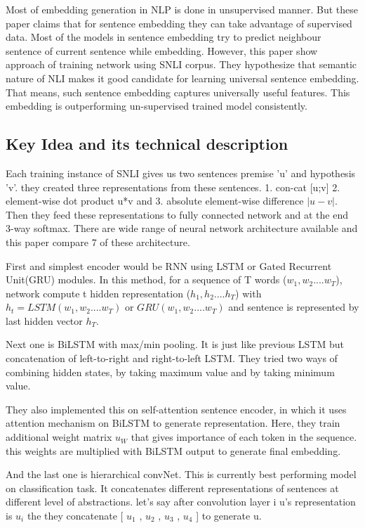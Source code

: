 \documentclass[11pt,a4paper]{article}
\begin{document}
Most of embedding generation in NLP is done in unsupervised manner. But these paper claims that for sentence embedding they can take advantage of supervised data. Most of the models in sentence embedding try to predict neighbour sentence of current sentence while embedding. However, this paper show approach of training network using SNLI corpus. They hypothesize that semantic nature of NLI makes it good candidate for learning universal sentence embedding. That means, such sentence embedding captures universally useful features. This embedding is outperforming un-supervised trained model consistently. 




\subsection{Key Idea and its technical description}

Each training instance of SNLI gives us two sentences premise 'u' and hypothesis 'v'. they created three representations from these sentences. 1. con-cat [u;v] 2. element-wise dot product u*v and 3. absolute element-wise difference $|u-v|$. Then they feed these representations to fully connected network and at the end 3-way softmax. There are wide range of neural network architecture available and this paper compare 7 of these architecture. 

First and simplest encoder would be RNN using LSTM or Gated Recurrent Unit(GRU) modules. In this method, for a sequence of T words ($w_{1},w_{2}....w_{T}$), network compute t hidden representation ($h_{1},h_{2}....h_{T}$) with $h_{t} = LSTM(w_{1},w_{2}....w_{T})$  or $GRU(w_{1},w_{2}....w_{T})$ and sentence is represented by last hidden vector $h_T$.

Next one is BiLSTM with max/min pooling.  It is just like previous LSTM but concatenation of left-to-right and right-to-left LSTM. They tried two ways of combining hidden states, by taking maximum value and by taking minimum value.

They also implemented this on self-attention sentence encoder, in which it uses attention mechanism on BiLSTM to generate representation. Here, they train additional weight matrix $u_{W}$ that gives importance of each token in the sequence. this weights are multiplied with BiLSTM output to generate final embedding. 

And the last one is hierarchical convNet. This is currently best performing model on classification task. It concatenates different representations of sentences at different level of abstractions. let's say after convolution layer i u's representation is $u_{i}$ the they concatenate  [ $u_{1}$ , $u_{2}$ , $u_{3}$ , $u_{4}$ ] to generate u.
\end{document}
